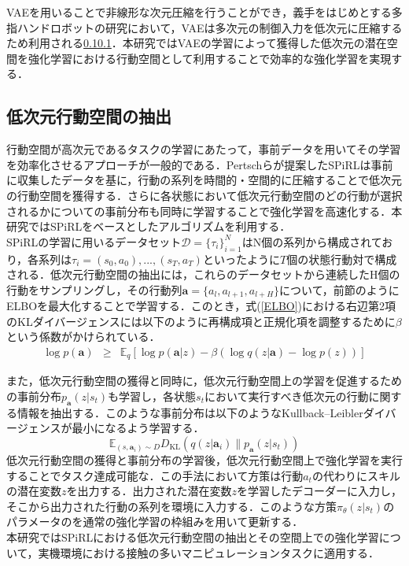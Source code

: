 \documentclass[dvipdfmx]{ampbt_nomag}
\begin{document}
VAEを用いることで非線形な次元圧縮を行うことができ，義手をはじめとする多指ハンドロボットの研究において，VAEは多次元の制御入力を低次元に圧縮するため利用される\ref{}\ref{}．本研究ではVAEの学習によって獲得した低次元の潜在空間を強化学習における行動空間として利用することで効率的な強化学習を実現する．




\subsection{低次元行動空間の抽出}

行動空間が高次元であるタスクの学習にあたって，事前データを用いてその学習を効率化させるアプローチが一般的である．Pertschらが提案したSPiRLは事前に収集したデータを基に，行動の系列を時間的・空間的に圧縮することで低次元の行動空間を獲得する．さらに各状態において低次元行動空間のどの行動が選択されるかについての事前分布も同時に学習することで強化学習を高速化する\cite{pertsch2021accelerating}．本研究ではSPiRLをベースとしたアルゴリズムを利用する．\\
SPiRLの学習に用いるデータセット$\mathcal{D}=\{\tau_i\}^{N}_{i=1}$はN個の系列から構成されており，各系列は$\tau_i = {(s_0, a_0), . . . ,(s_T, a_T)}$といったように$T$個の状態行動対で構成される．低次元行動空間の抽出には，これらのデータセットから連続したH個の行動をサンプリングし，その行動列$\boldsymbol{a}=\{a_l,a_{l+1},a_{l+H}\}$について，前節のようにELBOを最大化することで学習する．このとき，式(\ref{ELBO})における右辺第2項のKLダイバージェンスには以下のように再構成項と正規化項を調整するために$\beta$という係数がかけられている．
\begin{eqnarray} 
  \label{SPiRL_ELBO}
  \log p(\boldsymbol{a}) &\geq& \mathbb{E}_q [\log p(\boldsymbol{a}|z)  -\beta(\log{q(z|\boldsymbol{a})} - \log{p(z)})]
  \end{eqnarray}



また，低次元行動空間の獲得と同時に，低次元行動空間上の学習を促進するための事前分布$p_{\boldsymbol{a}}(z|s_t)$も学習し，各状態$s_t$において実行すべき低次元の行動に関する情報を抽出する．このような事前分布は以下のようなKullback--Leiblerダイバージェンスが最小になるよう学習する．
\begin{equation}
  \mathbb{E}_{(s,\boldsymbol{a}_i)\sim D}D_\mathrm{KL}\left(q(z|\boldsymbol{a}_i)\|p_{\boldsymbol{a}}(z|s_t)\right)
\end{equation}
低次元行動空間の獲得と事前分布の学習後，低次元行動空間上で強化学習を実行することでタスク達成可能な．この手法において方策は行動$a_t$の代わりにスキルの潜在変数$z$を出力する．出力された潜在変数$z$を学習したデコーダーに入力し，そこから出力された行動の系列を環境に入力する．このような方策$\pi_\theta(z|s_t)$のパラメータのを通常の強化学習の枠組みを用いて更新する．\\
本研究ではSPiRLにおける低次元行動空間の抽出とその空間上での強化学習について，実機環境における接触の多いマニピュレーションタスクに適用する．
\end{document}

